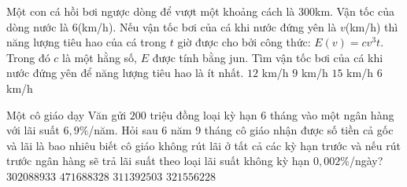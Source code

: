 \begin{ex}%
Một con cá hồi bơi ngược dòng để vượt một khoảng cách là $300$km. Vận tốc của dòng nước là $6$(km/h). Nếu vận tốc bơi của cá khi nước đứng yên là $v$(km/h) thì năng lượng tiêu hao của cá trong $t$ giờ được cho bởi công thức: $E(v) = cv^3t$. Trong đó $c$ là một hằng số, $E$ được tính bằng jun. Tìm vận tốc bơi của cá khi nước đứng yên để năng lượng tiêu hao là ít nhất.
\choice
{$12$ km/h}
{\True $9$ km/h}
{$15$  km/h}
{$6$ km/h}
\end{ex}

\begin{ex}%
Một cô giáo dạy Văn gửi $200$ triệu đồng loại kỳ hạn $6$ tháng vào một ngân hàng với lãi suất $6{,}9\%$/năm. Hỏi sau $6$ năm $9$ tháng cô giáo nhận được số tiền cả gốc và lãi là bao nhiêu biết cô giáo không rút lãi ở tất cả các kỳ hạn trước và nếu rút trước ngân hàng sẽ trả lãi suất theo loại lãi suất không kỳ hạn $0{,}002\%$/ngày?
\choice
{$302088933$}
{$471688328$}
{\True $311392503$}
{$321556228$}
\end{ex}

